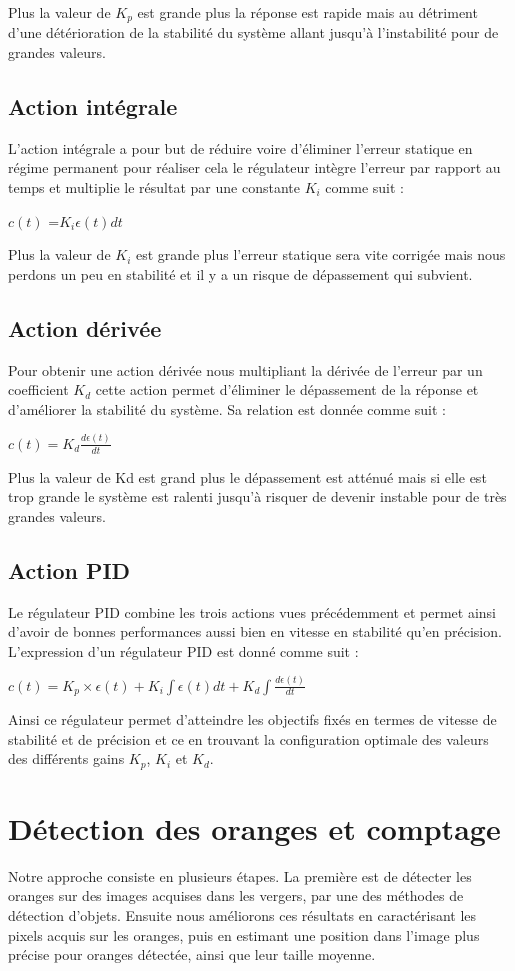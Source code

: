 \documentclass[a4paper,12pt]{report}
\begin{document}
Plus la valeur de $K_p$ est grande plus la réponse est rapide mais au détriment d’une détérioration
de la stabilité du système allant jusqu’à l’instabilité pour de grandes valeurs.




\subsection  {Action intégrale}
L’action intégrale a pour but de réduire voire d’éliminer l’erreur statique en régime permanent
pour réaliser cela le régulateur intègre l’erreur par rapport au temps et multiplie le résultat par une
constante $K_i$ comme suit :

$c(t) $ =$ K_i \epsilon(t) dt$


Plus la valeur de $K_i$ est grande plus l’erreur statique sera vite corrigée mais nous perdons un peu
en stabilité et il y a un risque de dépassement qui subvient.

\subsection  {Action dérivée}
Pour obtenir une action dérivée nous multipliant la dérivée de l’erreur par un coefficient $K_d$
cette action permet d’éliminer le dépassement de la réponse et d’améliorer la stabilité du système. Sa
relation est donnée comme suit :

$ c(t)  = K_d\frac{d\epsilon(t)}{dt}$


Plus la valeur de Kd est grand plus le dépassement est atténué mais si elle est trop grande le
système est ralenti jusqu’à risquer de devenir instable pour de très grandes valeurs.




\subsection {Action PID} 
Le régulateur PID combine les trois actions vues précédemment et permet ainsi d’avoir de
bonnes performances aussi bien en vitesse en stabilité qu’en précision. L’expression d’un régulateur
PID est donné comme suit :

$ c(t)=K_p\times \epsilon(t) + K_i\int\epsilon(t)dt+K_d\int\frac{d\epsilon(t)}{dt}$


Ainsi ce régulateur permet d’atteindre les objectifs fixés en termes de vitesse de stabilité et de
précision et ce en trouvant la configuration optimale des valeurs des différents gains $K_p $, $ K_i$ et $ K_d$.
\section{Détection des oranges et comptage}
Notre approche consiste en plusieurs étapes. La première est de détecter les oranges sur des images acquises dans les vergers, par une des méthodes de détection d’objets. Ensuite nous améliorons ces résultats en caractérisant les pixels acquis sur les oranges, puis en estimant une position  dans l’image plus précise pour oranges détectée, ainsi que leur taille moyenne.
\end{document}
